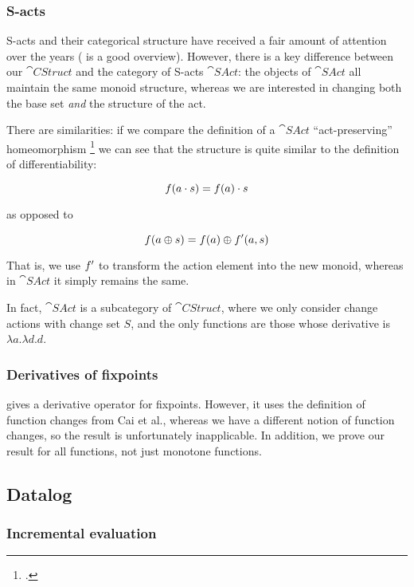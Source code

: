 \subsubsection{S-acts}

S-acts and their categorical structure have received a fair amount of attention
over the years (\textcite{kilp2000monoids} is a good
overview). However, there is a key difference between our $\cat{CStruct}$ and the category of
S-acts $\cat{SAct}$: the objects of $\cat{SAct}$ all maintain the same monoid
structure, whereas we are interested in changing both the base set \emph{and} the structure of the act.

There are similarities: if we compare the definition of a $\cat{SAct}$ ``act-preserving''
homeomorphism \footcite[See][]{kilp2000monoids} we can see that the structure is
quite similar to the definition of differentiability:

$$f(a \cdot s) = f(a) \cdot s$$

as opposed to

$$f(a \oplus s) = f(a) \oplus f'(a, s)$$

That is, we use $f'$ to transform the action element into the new
monoid, whereas in $\cat{SAct}$ it simply remains the same.

In fact, $\cat{SAct}$ is a subcategory of $\cat{CStruct}$, where we only
consider change actions with change set $S$, and the only functions are those
whose derivative is $\lambda a. \lambda d. d$.

\subsubsection{Derivatives of fixpoints}

\textcite{arntz2017fixpoints} gives a derivative operator for fixpoints. However,
it uses the definition of function changes from Cai et al., whereas
we have a different notion of function changes, so the result is unfortunately
inapplicable. In addition, we prove our result for all functions, not just
monotone functions.

\subsection{Datalog}

\subsubsection{Incremental evaluation}

